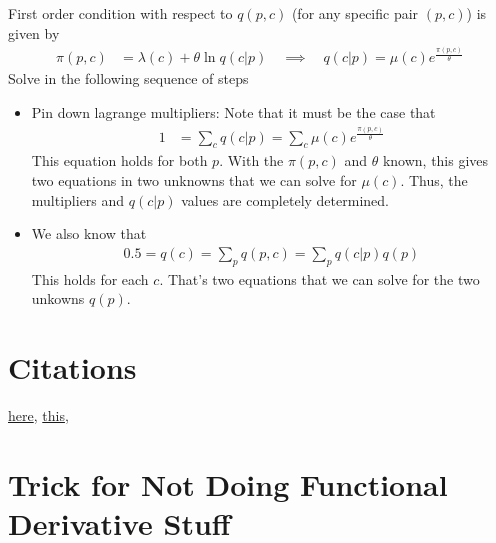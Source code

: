 \documentclass[12pt]{article}
\theoremstyle{plain}
\theoremstyle{definition}
\theoremstyle{remark}
\begin{document}
First order condition with respect to $q(p,c)$ (for any specific
pair $(p,c)$) is given by
\begin{align*}
  \pi(p,c)
  &=
  \lambda(c)
  +
  \theta
  \ln q(c|p)
  \quad\implies\quad
  q(c|p)
  =
  \mu(c)
  e^{\frac{\pi(p,c)}{\theta}}
\end{align*}
Solve in the following sequence of steps
\begin{itemize}
  \item Pin down lagrange multipliers:
    Note that it must be the case that
    \begin{align*}
      1 &=
      \sum_c q(c|p)
      =
      \sum_c
      \mu(c)
      e^{\frac{\pi(p,c)}{\theta}}
    \end{align*}
    This equation holds for both $p$.
    With the $\pi(p,c)$ and $\theta$ known, this gives two equations in two
    unknowns that we can solve for $\mu(c)$.
    Thus, the multipliers and $q(c|p)$ values are completely determined.

  \item
    We also know that
    \begin{align*}
      0.5 = q(c) = \sum_p q(p,c) = \sum_p q(c|p)q(p)
    \end{align*}
    This holds for each $c$. That's two equations that we can solve
    for the two unkowns $q(p)$.

\end{itemize}


















\appendix

\clearpage
\section{Citations}
\href{http://www.columbia.edu/~md3405/Behave_Col_BR_3_16.pdf}{here},
\href{https://infostructuralist.wordpress.com/2012/06/01/information-theory-in-economics-part-i-rational-inattention/}{this},

\clearpage
\section{Trick for Not Doing Functional Derivative Stuff}
\end{document}
